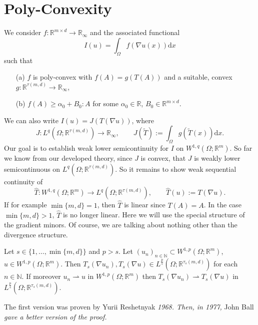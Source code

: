 \section{Poly-Convexity}
We consider $f:\mathbb{R}^{m\times d}\longrightarrow\mathbb{R}_\infty$ and the associated functional
\[I(u)=\int_\Omega{f(\nabla u(x))\mathrm{d}x}\]
such that
\begin{itemize}
	\item[(a)] $f$ is poly-convex with $f(A)=g(T(A))$ and a suitable, convex $g:\mathbb{R}^{\tau(m,d)}\longrightarrow\mathbb{R}_\infty$,
	\item[(b)] $f(A)\geq\alpha_0+B_0:A$ for some $\alpha_0\in\mathbb{R}$, $B_0\in\mathbb{R}^{m\times d}$.\\
\end{itemize}

We can also write $I(u)=J(T(\nabla u))$, where
\[J:L^q(\Omega;\mathbb{R}^{\tau(m,d)})\longrightarrow\mathbb{R}_\infty,\qquad J(\widetilde{T}):=\int_\Omega{g(\widetilde{T}(x))\mathrm{d}x}.\]
Our goal is to establish weak lower semicontinuity for $I$ on $W^{1,q}(\Omega;\mathbb{R}^m)$. So far we know from our developed theory, since $J$ is convex, that $J$ is weakly lower semicontinuous on $L^q(\Omega;\mathbb{R}^{\tau(m,d)})$. So it remains to show weak sequential continuity of
\[\widehat{T}:W^{1,q}(\Omega;\mathbb{R}^m)\longrightarrow L^q(\Omega;\mathbb{R}^{\tau(m,d)}),\qquad\widehat{T}(u):=T(\nabla u).\]
If for example $\min\{m,d\}=1$, then $\widehat{T}$ is linear since $T(A)=A$. In the case $\min\{m,d\}>1$, $\widehat{T}$ is no longer linear. Here we will use the special structure of the gradient minors. Of course, we are talking about nothing other than the divergence structure.\\[11pt]

\begin{theorem}
Let $s\in\{1,\dotsc,\min\{m,d\}\}$ and $p>s$. Let $(u_n)_{n\in\mathbb{N}}\subset W^{1,p}(\Omega;\mathbb{R}^m)$, $u\in W^{1,p}(\Omega;\mathbb{R}^m)$. Then $T_s(\nabla u_n),T_s(\nabla u)\in L^{\frac{p}{s}}(\Omega;\mathbb{R}^{\tau_s(m,d)})$ for each $n\in\mathbb{N}$. If moreover $u_n\rightharpoonup u$ in $W^{1,p}(\Omega;\mathbb{R}^m)$ then $T_s(\nabla u_n)\rightharpoonup T_s(\nabla u)$ in $L^\frac{p}{s}(\Omega;\mathbb{R}^{\tau_s(m,d)})$.
\end{theorem}

\begin{remark} 
The first version was proven by Yurii Reshetnyak \textit{1968. Then, in 1977,} John Ball \textit{gave a better version of the proof.}
\end{remark}

